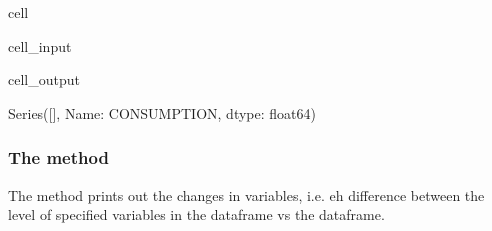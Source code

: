 \documentclass[letterpaper,10pt,english]{jupyterBook}
\begin{document}
\begin{sphinxuseclass}{cell}\begin{sphinxVerbatimInput}

\begin{sphinxuseclass}{cell_input}
\begin{sphinxVerbatim}[commandchars=\\\{\}]
\PYG{p}{[}\PYG{p}{]}
\end{sphinxVerbatim}

\end{sphinxuseclass}\end{sphinxVerbatimInput}
\begin{sphinxVerbatimOutput}

\begin{sphinxuseclass}{cell_output}
\begin{sphinxVerbatim}[commandchars=\\\{\}]
Series([], Name: CONSUMPTION, dtype: float64)
\end{sphinxVerbatim}

\end{sphinxuseclass}\end{sphinxVerbatimOutput}

\end{sphinxuseclass}

\subsubsection{The  method}
\label{\detokenize{content/03_Installation/TestingModelFlow:the-dif-df-method}}
\sphinxAtStartPar
The  method prints out the changes in variables, i.e. eh difference between the level of specified  variables in the  dataframe vs the  dataframe.
\end{document}
